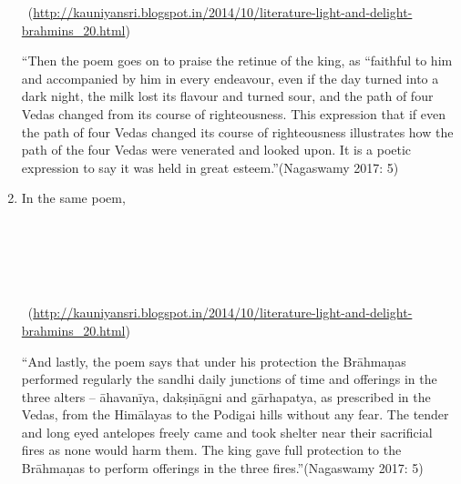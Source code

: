 \begin{enumerate}[{\rm 1.}]
\begin{myquote}
~\hfill (\url{http://kauniyansri.blogspot.in/2014/10/literature-light-and-delight-brahmins_20.html})
\end{myquote}

\begin{myquote}
“Then the poem goes on to praise the retinue of the king, as “faithful to him and accompanied by him in every endeavour, even if the day turned into a dark night, the milk lost its flavour and turned sour, and the path of four Vedas changed from its course of righteousness. This expression that if even the path of four Vedas changed its course of righteousness illustrates how the path of the four Vedas were venerated and looked upon. It is a poetic expression to say it was held in great esteem.”\hfill (Nagaswamy 2017: 5)
\end{myquote}


 \item 
 In the same poem,

\begin{myquote}
 \\\\\\\\

~\hfill (\url{http://kauniyansri.blogspot.in/2014/10/literature-light-and-delight-brahmins_20.html})
\end{myquote}

\begin{myquote}
“And lastly, the poem says that under his protection the Brāhmaṇas performed regularly the sandhi daily junctions of time and offerings in the three alters – āhavanīya, dakṣiṇāgni and gārhapatya, as prescribed in the Vedas, from the Himālayas to the Podigai hills without any fear. The tender and long eyed antelopes freely came and took shelter near their sacrificial fires as none would harm them. The king gave full protection to the Brāhmaṇas to perform offerings in the three fires.”\hfill (Nagaswamy 2017: 5)
\end{myquote}



\end{enumerate}

